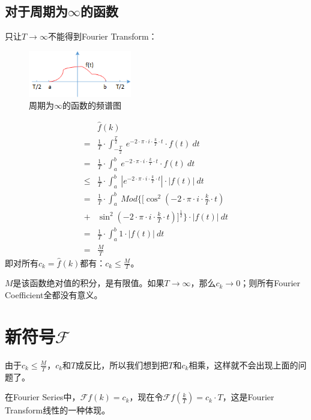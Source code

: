 \subsection{对于周期为$\infty$的函数}
只让$T\rightarrow \infty$不能得到Fourier Transform：
\begin{figure}[H]
	\centering
	\includegraphics[width=0.4\textwidth]{assets/ft3.png}
	\caption{周期为$\infty$的函数的频谱图}
\end{figure}
\begin{align*}
	     & \hat{f}(k)                                                                                                       \\
	=    & \frac{1}{T}\cdot \int_{-\frac{T}{2}}^{\frac{T}{2}}\ e^{-2\cdot \pi\cdot i\cdot \frac{k}{T}\cdot t}\cdot f(t)\ dt \\
	=    & \frac{1}{T}\cdot \int_{a}^{b}\ e^{-2\cdot \pi\cdot i\cdot \frac{k}{T}\cdot t}\cdot f(t)\ dt                      \\
	\leq & \frac{1}{T}\cdot \int_{a}^{b}\ |e^{-2\cdot \pi\cdot i\cdot \frac{k}{T}\cdot t}|\cdot |f(t)|\ dt                  \\
	=    & \frac{1}{T}\cdot \int_{a}^{b}\ Mod\{[\cos^2(-2\cdot \pi\cdot i\cdot \frac{k}{T}\cdot t)                          \\
	+    & \sin^2(-2\cdot \pi\cdot i\cdot \frac{k}{T}\cdot t)]^{\frac{1}{2}}\}\cdot |f(t)|\ dt                              \\
	=    & \frac{1}{T}\cdot \int_a^b 1\cdot |f(t)|\ dt                                                                      \\
	=    & \frac{M}{T}
\end{align*}
即对所有$c_k=\hat{f}(k)$都有：$c_k\leq \frac{M}{T}$。

$M$是该函数绝对值的积分，是有限值。如果$T\rightarrow \infty$，那么$c_k\rightarrow 0$；则所有Fourier Coefficient全都没有意义。
\section{新符号$\mathcal{F}$}
由于$c_k\leq \frac{M}{T}$，$c_k$和$T$成反比，所以我们想到把$T$和$c_k$相乘，这样就不会出现上面的问题了。

在Fourier Series中，$\mathcal{F}f(k)=c_k$，现在令$\mathcal{F}f(\frac{k}{T})=c_k\cdot T$，这是Fourier Transform线性的一种体现。

